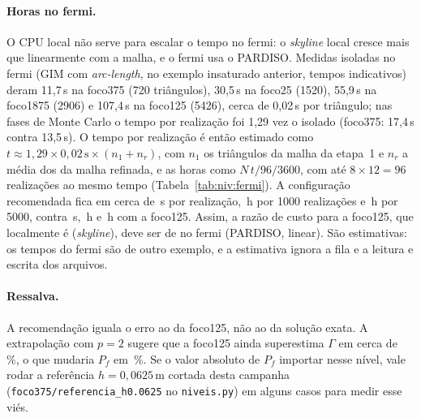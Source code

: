 \paragraph{Horas no fermi.} O CPU local não serve para escalar o tempo no fermi: o \emph{skyline} local cresce mais
que linearmente com a malha, e o fermi usa o PARDISO. Medidas isoladas no fermi (GIM com \emph{arc-length}, no
exemplo insaturado anterior, tempos indicativos) deram 11,7\,s na foco375 (720 triângulos), 30,5\,s na foco25 (1520),
55,9\,s na foco1875 (2906) e 107,4\,s na foco125 (5426), cerca de 0,02\,s por triângulo; nas fases de Monte Carlo o
tempo por realização foi 1,29 vez o isolado (foco375: 17,4\,s contra 13,5\,s). O tempo por realização é então
estimado como $t \approx 1{,}29 \times 0{,}02\,\text{s} \times (n_1 + n_r)$, com $n_1$ os triângulos da malha da
etapa~1 e $n_r$ a média dos da malha refinada, e as horas como $N\,t/96/3600$, com até $8 \times 12 = 96$ realizações
ao mesmo tempo (Tabela~\ref{tab:niv:fermi}). A configuração recomendada fica em cerca de \nivFermiTFC\,s por
realização, \nivFermiHmilFC\,h por 1000 realizações e \nivFermiHcincoFC\,h por 5000, contra \nivFermiTFfixD\,s,
\nivFermiHmilFfixD\,h e \nivFermiHcincoFfixD\,h com a foco125. Assim, a razão de custo para a foco125, que localmente é
\nivFCRcent{} (\emph{skyline}), deve ser de \nivFermiRazFC{} no fermi (PARDISO, linear). São estimativas: os tempos do
fermi são de outro exemplo, e a estimativa ignora a fila e a leitura e escrita dos arquivos.

\begin{table}[H]
  \centering\small
  \caption{Estimativa do custo no fermi: triângulos da cadeia ($n_1 + n_r$), tempo por realização
  $t \approx 1{,}29 \times 0{,}02\,\text{s} \times (n_1 + n_r)$ e sua razão para a foco125, a razão de CPU local
  ($R/R_{125}$, \emph{skyline}) para comparação, e as horas para 1000 e 5000 realizações com 96 ao mesmo tempo.}
  \label{tab:niv:fermi}
  
\end{table}

\paragraph{Ressalva.} A recomendação iguala o erro ao da foco125, não ao da solução exata. A extrapolação com $p = 2$
sugere que a foco125 ainda superestima $\Gamma$ em cerca de \nivBzero\,\%, o que mudaria $P_f$ em \nivDpfZero\,\%.
Se o valor absoluto de $P_f$ importar nesse nível, vale rodar a referência $h = 0{,}0625$\,m cortada desta campanha
(\texttt{foco375/referencia\_h0.0625} no \texttt{niveis.py}) em alguns casos para medir esse viés.

